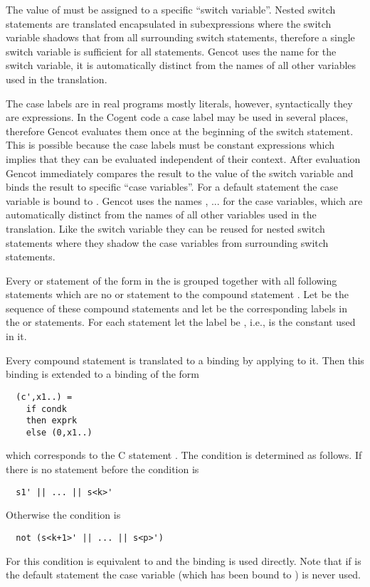 The value of  must be assigned to a specific ``switch variable''. Nested switch statements are translated encapsulated 
in subexpressions where the switch variable shadows that from all surrounding switch statements, therefore a single switch variable 
is sufficient for all statements. Gencot uses the name  for the switch variable, it is automatically distinct from the names of
all other variables used in the translation. 

The case labels are in real programs mostly literals, however, syntactically they are 
expressions. In the Cogent code a case label may be used in several places, therefore Gencot evaluates them once at the beginning 
of the switch statement. This is possible because the case labels must be constant 
expressions which implies that they can be evaluated independent of their context. After evaluation Gencot immediately compares the result
to the value of the switch variable and binds the result to specific ``case variables''. For a default statement the case variable is
bound to . Gencot uses the names , ... for the 
case variables, which are automatically distinct from the names of all other variables used in the translation. Like the switch variable
they can be reused for nested switch statements where they shadow the case variables from surrounding switch statements.

Every  or  statement  of the form  in the  is grouped together with all 
following statements  which are no  or  statement to the compound statement .
Let  be the sequence of these compound statements and let  be the corresponding labels in the 
or  statements. For each  statement let the label  be , i.e.,  is the constant
used in it.

Every compound statement  is translated to a binding  by applying  to it. 
Then this binding is extended to a binding  of the form
\begin{verbatim}
  (c',x1..) = 
    if condk
    then exprk
    else (0,x1..)
\end{verbatim}
which corresponds to the C statement . The condition  is determined as follows.
If there is no  statement before  the condition is
\begin{verbatim}
  s1' || ... || s<k>'
\end{verbatim}
Otherwise the condition is
\begin{verbatim}
  not (s<k+1>' || ... || s<p>')
\end{verbatim}
For  this condition is equivalent to  and the binding  is used directly. Note that if
 is the default statement the case variable  (which has been bound to ) is never used.

